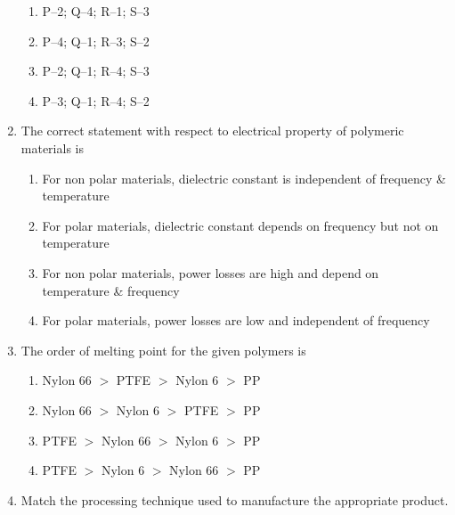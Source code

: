 \documentclass[journal,12pt,onecolumn]{IEEEtran}
\begin{document}
\begin{enumerate}[label=\arabic*)]
\vspace{0.2cm}
\begin{enumerate}[label=\alph*)]
\item P–2; Q–4; R–1; S–3
\item P–4; Q–1; R–3; S–2
\item P–2; Q–1; R–4; S–3
\item P–3; Q–1; R–4; S–2
\end{enumerate}

\vspace{0.5cm}

\item The correct statement with respect to electrical property of polymeric materials is
\hfill{} \\

\vspace{0.2cm}
\begin{enumerate}[label=\alph*)]
\item For non polar materials, dielectric constant is independent of frequency \& temperature
\item For polar materials, dielectric constant depends on frequency but not on temperature
\item For non polar materials, power losses are high and depend on temperature \& frequency
\item For polar materials, power losses are low and independent of frequency
\end{enumerate}

\vspace{0.5cm}

\item The order of melting point for the given polymers is
\hfill{} \\

\vspace{0.2cm}
\begin{enumerate}[label=\alph*)]
\item Nylon 66 $>$ PTFE $>$ Nylon 6 $>$ PP
\item Nylon 66 $>$ Nylon 6 $>$ PTFE $>$ PP
\item PTFE $>$ Nylon 66 $>$ Nylon 6 $>$ PP
\item PTFE $>$ Nylon 6 $>$ Nylon 66 $>$ PP
\end{enumerate}

\vspace{0.5cm}

\item Match the processing technique used to manufacture the appropriate product.


\end{enumerate}
\end{document}
